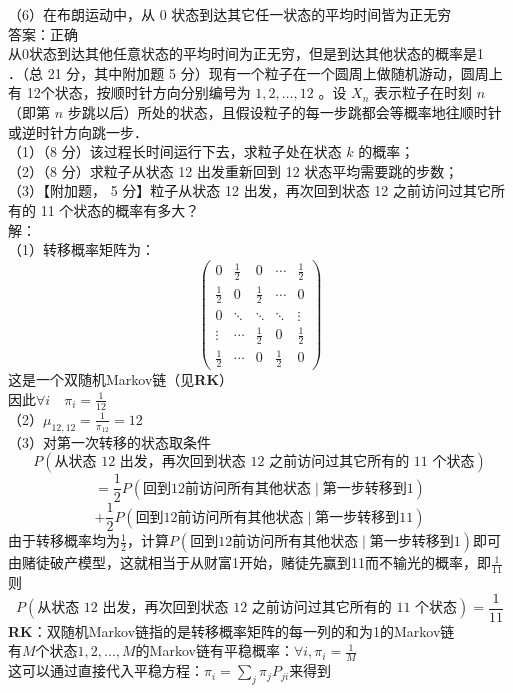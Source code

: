 \documentclass[UTF8,openany]{book}
\begin{document}
\noindent （6）在布朗运动中，从 0 状态到达其它任一状态的平均时间皆为正无穷\\
答案：正确\\
从0状态到达其他任意状态的平均时间为正无穷，但是到达其他状态的概率是1\\


．（总 21 分，其中附加题 5 分）现有一个粒子在一个圆周上做随机游动，圆周上有 12个状态，按顺时针方向分别编号为 $1,2, \ldots, 12$ 。设 $X_{n}$ 表示粒子在时刻 $n$（即第 $n$ 步跳以后）所处的状态，且假设粒子的每一步跳都会等概率地往顺时针或逆时针方向跳一步．\\
（1）（8 分）该过程长时间运行下去，求粒子处在状态 $k$ 的概率；\\
（2）（8 分）求粒子从状态 12 出发重新回到 12 状态平均需要跳的步数；\\
（3）【附加题， 5 分】粒子从状态 12 出发，再次回到状态 12 之前访问过其它所有的 11 个状态的概率有多大？\\
解：\\
（1）转移概率矩阵为：\\
\[
\begin{pmatrix}
	0 & \frac{1}{2} & 0      & \cdots & \frac{1}{2} \\
	\frac{1}{2} & 0 & \frac{1}{2} & \cdots & 0 \\
	0      & \ddots & \ddots & \ddots & \vdots \\
	\vdots & \cdots & \frac{1}{2}& 0 & \frac{1}{2}\\
	\frac{1}{2}      & \cdots & 0      & \frac{1}{2}& 0
\end{pmatrix}
\]
这是一个双随机Markov链（见\textbf{RK}）\\
因此$\forall i \quad \pi_i=\frac{1}{12}$\\
（2）$\mu_{12,12}=\frac{1}{\pi_{12}}=12$\\
（3）对第一次转移的状态取条件\\
\[
P(\text{从状态 12 出发，再次回到状态 12 之前访问过其它所有的 11 个状态}) 
\]
\[
= \frac{1}{2}P(\text{回到12前访问所有其他状态} \mid \text{第一步转移到1}) 
\]
\[
+ \frac{1}{2}P(\text{回到12前访问所有其他状态} \mid \text{第一步转移到11})
\]
由于转移概率均为$\frac{1}{2}$，计算$P(\text{回到12前访问所有其他状态} \mid \text{第一步转移到1})$即可\\
由赌徒破产模型，这就相当于从财富1开始，赌徒先赢到11而不输光的概率，即$\frac{1}{11}$\\
则
\[
P(\text{从状态 12 出发，再次回到状态 12 之前访问过其它所有的 11 个状态}) =\frac{1}{11}
\]
\textbf{RK}：双随机Markov链指的是转移概率矩阵的每一列的和为1的Markov链\\
有$M$个状态$1,2,...,M$的Markov链有平稳概率：$\forall i,\pi_i=\frac{1}{M}$\\
这可以通过直接代入平稳方程：$\pi_i=\sum\limits_{j}^{}\pi_j P_{ji}$来得到\\
\end{document}

